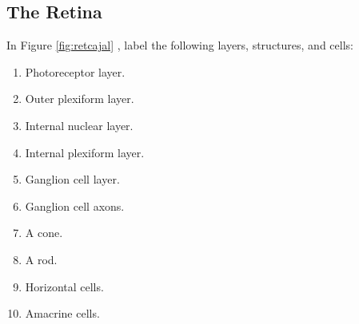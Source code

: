 \documentclass[]{book}
\providecommand{\tightlist}{%
  \setlength{\itemsep}{0pt}\setlength{\parskip}{0pt}}
\begin{document}
\hypertarget{the-retina}{%
\subsection{The Retina}\label{the-retina}}

In Figure \ref{fig:retcajal} , label the following layers, structures, and cells:

\begin{enumerate}
\def\labelenumi{\arabic{enumi}.}
\tightlist
\item
  Photoreceptor layer.
\item
  Outer plexiform layer.
\item
  Internal nuclear layer.
\item
  Internal plexiform layer.
\item
  Ganglion cell layer.
\item
  Ganglion cell axons.
\item
  A cone.
\item
  A rod.
\item
  Horizontal cells.
\item
  Amacrine cells.
\end{enumerate}
\end{document}
